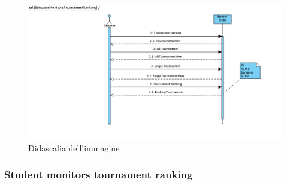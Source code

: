     \begin{figure}[H]
  \includegraphics[width=1\linewidth]{SequenceDiagram/EducTournamentRanking.png} 
  \caption{Didascalia dell'immagine}
  \label{fig:immagine}
\end{figure}

\subsubsection{Student monitors tournament ranking}

